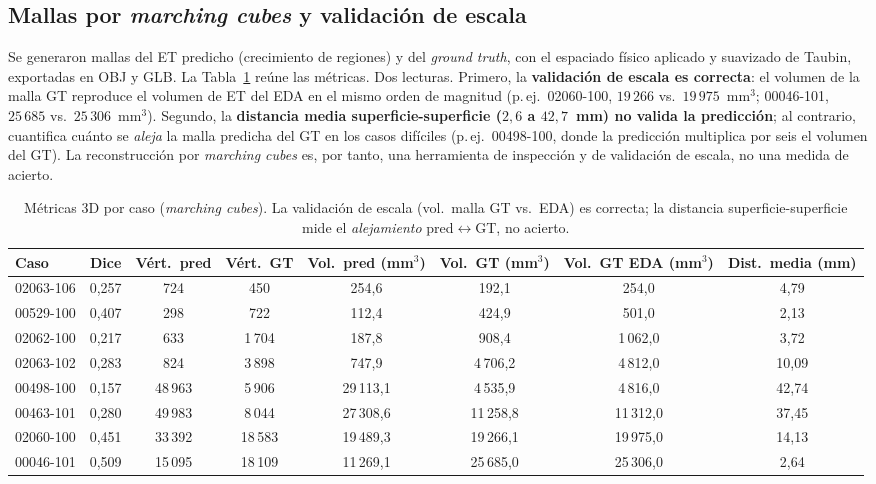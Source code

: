 \documentclass[conference]{IEEEtran}
\begin{document}
\subsection{Mallas por \textit{marching cubes} y validación de escala}
Se generaron mallas del ET predicho (crecimiento de regiones) y del
\textit{ground truth}, con el espaciado físico aplicado y suavizado de Taubin,
exportadas en OBJ y GLB. La Tabla~\ref{tab:recon3d} reúne las métricas. Dos
lecturas. Primero, la \textbf{validación de escala es correcta}: el volumen de
la malla GT reproduce el volumen de ET del EDA en el mismo orden de magnitud
(p.\,ej.\ 02060-100, $19\,266$ vs.\ $19\,975$~mm$^3$; 00046-101, $25\,685$
vs.\ $25\,306$~mm$^3$). Segundo, la \textbf{distancia media
superficie-superficie ($2{,}6$ a $42{,}7$~mm) no valida la predicción}; al
contrario, cuantifica cuánto se \emph{aleja} la malla predicha del GT en los
casos difíciles (p.\,ej.\ 00498-100, donde la predicción multiplica por seis
el volumen del GT). La reconstrucción por \textit{marching cubes} es, por
tanto, una herramienta de inspección y de validación de escala, no una medida
de acierto.

\begin{table}[t]
\centering
\caption{Métricas 3D por caso (\textit{marching cubes}). La validación de
escala (vol.\ malla GT vs.\ EDA) es correcta; la distancia
superficie-superficie mide el \emph{alejamiento} pred$\leftrightarrow$GT, no
acierto.}
\label{tab:recon3d}
\begin{tabular}{lccccccc}
\toprule
Caso & Dice & Vért.\ pred & Vért.\ GT & Vol.\ pred (mm$^3$) &
Vol.\ GT (mm$^3$) & Vol.\ GT EDA (mm$^3$) & Dist.\ media (mm) \\
\midrule
02063-106 & 0,257 & 724    & 450    & 254,6    & 192,1    & 254,0    & 4,79 \\
00529-100 & 0,407 & 298    & 722    & 112,4    & 424,9    & 501,0    & 2,13 \\
02062-100 & 0,217 & 633    & 1\,704 & 187,8    & 908,4    & 1\,062,0 & 3,72 \\
02063-102 & 0,283 & 824    & 3\,898 & 747,9    & 4\,706,2 & 4\,812,0 & 10,09 \\
00498-100 & 0,157 & 48\,963 & 5\,906 & 29\,113,1 & 4\,535,9 & 4\,816,0 & 42,74 \\
00463-101 & 0,280 & 49\,983 & 8\,044 & 27\,308,6 & 11\,258,8 & 11\,312,0 & 37,45 \\
02060-100 & 0,451 & 33\,392 & 18\,583 & 19\,489,3 & 19\,266,1 & 19\,975,0 & 14,13 \\
00046-101 & 0,509 & 15\,095 & 18\,109 & 11\,269,1 & 25\,685,0 & 25\,306,0 & 2,64 \\
\bottomrule
\end{tabular}
\end{table}
\end{document}
